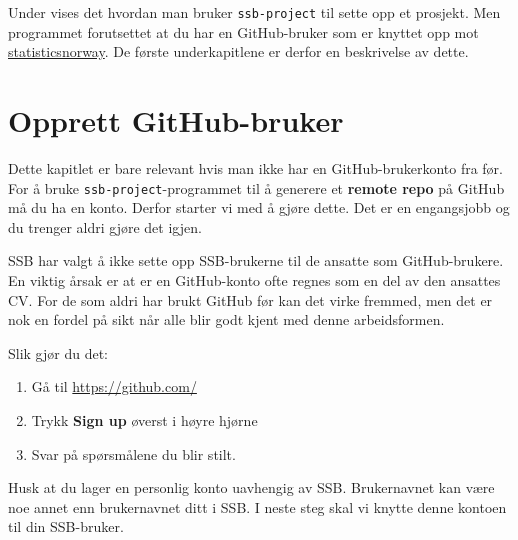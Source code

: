 \documentclass[
  letterpaper,
  DIV=11,
  numbers=noendperiod]{scrreprt}
\providecommand{\tightlist}{%
  \setlength{\itemsep}{0pt}\setlength{\parskip}{0pt}}\usepackage{longtable,booktabs,array}
\begin{document}
Under vises det hvordan man bruker \texttt{ssb-project} til sette opp et
prosjekt. Men programmet forutsettet at du har en GitHub-bruker som er
knyttet opp mot
\href{https://github.com/statisticsnorway}{statisticsnorway}. De første
underkapitlene er derfor en beskrivelse av dette.

\hypertarget{opprett-github-bruker}{%
\section{Opprett GitHub-bruker}\label{opprett-github-bruker}}

Dette kapitlet er bare relevant hvis man ikke har en GitHub-brukerkonto
fra før. For å bruke \texttt{ssb-project}-programmet til å generere et
\textbf{remote repo} på GitHub må du ha en konto. Derfor starter vi med
å gjøre dette. Det er en engangsjobb og du trenger aldri gjøre det
igjen.

\begin{tcolorbox}[enhanced jigsaw, colback=white, rightrule=.15mm, opacityback=0, bottomrule=.15mm, leftrule=.75mm, arc=.35mm, toprule=.15mm, colframe=quarto-callout-note-color-frame, left=2mm, breakable]
\begin{minipage}[t]{5.5mm}
\textcolor{quarto-callout-note-color}{\faInfo}
\end{minipage}%
\begin{minipage}[t]{\textwidth - 5.5mm}
SSB har valgt å ikke sette opp SSB-brukerne til de ansatte som
GitHub-brukere. En viktig årsak er at er en GitHub-konto ofte regnes som
en del av den ansattes CV. For de som aldri har brukt GitHub før kan det
virke fremmed, men det er nok en fordel på sikt når alle blir godt kjent
med denne arbeidsformen.\end{minipage}%
\end{tcolorbox}

Slik gjør du det:

\begin{enumerate}
\def\labelenumi{\arabic{enumi}.}
\tightlist
\item
  Gå til \url{https://github.com/}
\item
  Trykk \textbf{Sign up} øverst i høyre hjørne
\item
  Svar på spørsmålene du blir stilt.
\end{enumerate}

Husk at du lager en personlig konto uavhengig av SSB. Brukernavnet kan
være noe annet enn brukernavnet ditt i SSB. I neste steg skal vi knytte
denne kontoen til din SSB-bruker.
\end{document}
